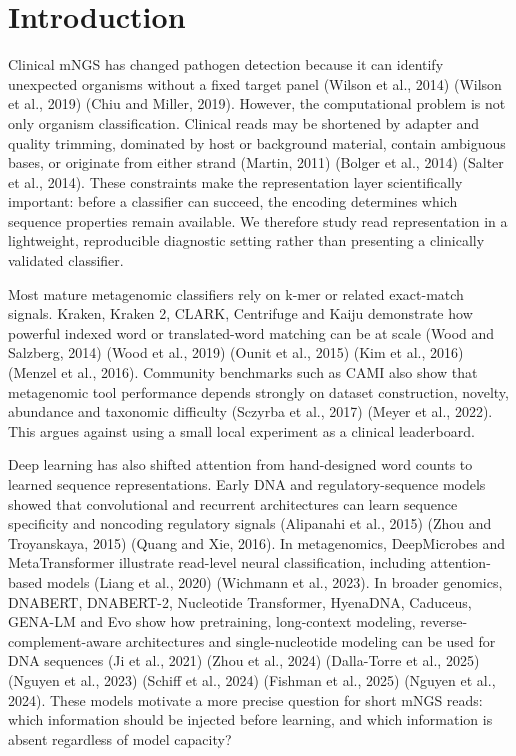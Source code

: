 \documentclass[11pt]{article}
\begin{document}
\section*{Introduction}

Clinical mNGS has changed pathogen detection because it can identify unexpected organisms without a fixed target panel (Wilson et al., 2014) (Wilson et al., 2019) (Chiu and Miller, 2019). However, the computational problem is not only organism classification. Clinical reads may be shortened by adapter and quality trimming, dominated by host or background material, contain ambiguous bases, or originate from either strand (Martin, 2011) (Bolger et al., 2014) (Salter et al., 2014). These constraints make the representation layer scientifically important: before a classifier can succeed, the encoding determines which sequence properties remain available. We therefore study read representation in a lightweight, reproducible diagnostic setting rather than presenting a clinically validated classifier.


Most mature metagenomic classifiers rely on k-mer or related exact-match signals. Kraken, Kraken 2, CLARK, Centrifuge and Kaiju demonstrate how powerful indexed word or translated-word matching can be at scale (Wood and Salzberg, 2014) (Wood et al., 2019) (Ounit et al., 2015) (Kim et al., 2016) (Menzel et al., 2016). Community benchmarks such as CAMI also show that metagenomic tool performance depends strongly on dataset construction, novelty, abundance and taxonomic difficulty (Sczyrba et al., 2017) (Meyer et al., 2022). This argues against using a small local experiment as a clinical leaderboard.


Deep learning has also shifted attention from hand-designed word counts to learned sequence representations. Early DNA and regulatory-sequence models showed that convolutional and recurrent architectures can learn sequence specificity and noncoding regulatory signals (Alipanahi et al., 2015) (Zhou and Troyanskaya, 2015) (Quang and Xie, 2016). In metagenomics, DeepMicrobes and MetaTransformer illustrate read-level neural classification, including attention-based models (Liang et al., 2020) (Wichmann et al., 2023). In broader genomics, DNABERT, DNABERT-2, Nucleotide Transformer, HyenaDNA, Caduceus, GENA-LM and Evo show how pretraining, long-context modeling, reverse-complement-aware architectures and single-nucleotide modeling can be used for DNA sequences (Ji et al., 2021) (Zhou et al., 2024) (Dalla-Torre et al., 2025) (Nguyen et al., 2023) (Schiff et al., 2024) (Fishman et al., 2025) (Nguyen et al., 2024). These models motivate a more precise question for short mNGS reads: which information should be injected before learning, and which information is absent regardless of model capacity?
\end{document}
